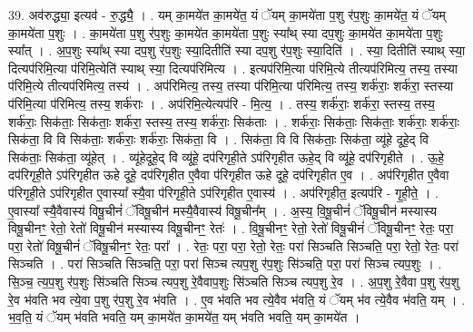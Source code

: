 \documentclass[17pt]{extarticle}
\begin{document}
39. अव॑रुद्ध्या॒ इत्यव॑ - रु॒द्ध्यै॒ । . यम् का॒मये॑त का॒मये॑त॒ यं ॅयम् का॒मये॑ता प॒शु र॑प॒शुः का॒मये॑त॒ यं ॅयम् का॒मये॑ता प॒शुः । . का॒मये॑ता प॒शु र॑प॒शुः का॒मये॑त का॒मये॑ता प॒शुः स्या᳚थ् स्या दप॒शुः का॒मये॑त का॒मये॑ता प॒शुः स्या᳚त् । . अ॒प॒शुः स्या᳚थ् स्या दप॒शु र॑प॒शुः स्या॒दितीति॑ स्या दप॒शु र॑प॒शुः स्या॒दिति॑ । . स्या॒ दितीति॑ स्याथ् स्या॒ दित्यप॑रिमि॒त्या प॑रिमि॒त्येति॑ स्याथ् स्या॒ दित्यप॑रिमित्य । . इत्यप॑रिमि॒त्या प॑रिमि॒त्ये तीत्यप॑रिमित्य॒ तस्य॒ तस्या प॑रिमि॒त्ये तीत्यप॑रिमित्य॒ तस्य॑ । . अप॑रिमित्य॒ तस्य॒ तस्या प॑रिमि॒त्या प॑रिमित्य॒ तस्य॒ शर्क॑राः॒ शर्क॑रा॒ स्तस्या प॑रिमि॒त्या प॑रिमित्य॒ तस्य॒ शर्क॑राः । . अप॑रिमि॒त्येत्यप॑रि - मि॒त्य॒ । . तस्य॒ शर्क॑राः॒ शर्क॑रा॒ स्तस्य॒ तस्य॒ शर्क॑राः॒ सिक॑ताः॒ सिक॑ताः॒ शर्क॑रा॒ स्तस्य॒ तस्य॒ शर्क॑राः॒ सिक॑ताः । . शर्क॑राः॒ सिक॑ताः॒ सिक॑ताः॒ शर्क॑राः॒ शर्क॑राः॒ सिक॑ता॒ वि वि सिक॑ताः॒ शर्क॑राः॒ शर्क॑राः॒ सिक॑ता॒ वि । . सिक॑ता॒ वि वि सिक॑ताः॒ सिक॑ता॒ व्यू॑हे दूहे॒द् वि सिक॑ताः॒ सिक॑ता॒ व्यू॑हेत् । . व्यू॑हेदूहे॒द् वि व्यू॑हे॒ दप॑रिगृही॒ते ऽप॑रिगृहीत ऊहे॒द् वि व्यू॑हे॒ दप॑रिगृहीते । . ऊ॒हे॒ दप॑रिगृही॒ते ऽप॑रिगृहीत ऊहे दूहे॒ दप॑रिगृहीत ए॒वैवा प॑रिगृहीत ऊहे दूहे॒ दप॑रिगृहीत ए॒व । . अप॑रिगृहीत ए॒वैवा प॑रिगृही॒ते ऽप॑रिगृहीत ए॒वास्या᳚ स्यै॒वा प॑रिगृही॒ते ऽप॑रिगृहीत ए॒वास्य॑ । . अप॑रिगृहीत॒ इत्यप॑रि - गृ॒ही॒ते॒ । . ए॒वास्या᳚ स्यै॒वैवास्य॑ विषू॒चीनं॑ ॅविषू॒चीन॑ मस्यै॒वैवास्य॑ विषू॒चीन᳚म् । . अ॒स्य॒ वि॒षू॒चीनं॑ ॅविषू॒चीन॑ मस्यास्य विषू॒चीनꣳ॒॒ रेतो॒ रेतो॑ विषू॒चीन॑ मस्यास्य विषू॒चीनꣳ॒॒ रेतः॑ । . वि॒षू॒चीनꣳ॒॒ रेतो॒ रेतो॑ विषू॒चीनं॑ ॅविषू॒चीनꣳ॒॒ रेतः॒ परा॒ परा॒ रेतो॑ विषू॒चीनं॑ ॅविषू॒चीनꣳ॒॒ रेतः॒ परा᳚ । . रेतः॒ परा॒ परा॒ रेतो॒ रेतः॒ परा॑ सिञ्चति सिञ्चति॒ परा॒ रेतो॒ रेतः॒ परा॑ सिञ्चति । . परा॑ सिञ्चति सिञ्चति॒ परा॒ परा॑ सिञ्च त्यप॒शु र॑प॒शुः सि॑ञ्चति॒ परा॒ परा॑ सिञ्च त्यप॒शुः । . सि॒ञ्च॒ त्य॒प॒शु र॑प॒शुः सि॑ञ्चति सिञ्च त्यप॒शु रे॒वैवाप॒शुः सि॑ञ्चति सिञ्च त्यप॒शु रे॒व । . अ॒प॒शु रे॒वैवा प॒शु र॑प॒शु रे॒व भ॑वति भव त्ये॒वा प॒शु र॑प॒शु रे॒व भ॑वति । . ए॒व भ॑वति भव त्ये॒वैव भ॑वति॒ यं ॅयम् भ॑व त्ये॒वैव भ॑वति॒ यम् । . भ॒व॒ति॒ यं ॅयम् भ॑वति भवति॒ यम् का॒मये॑त का॒मये॑त॒ यम् भ॑वति भवति॒ यम् का॒मये॑त । \newline
\pagebreak
{}
\end{document}

